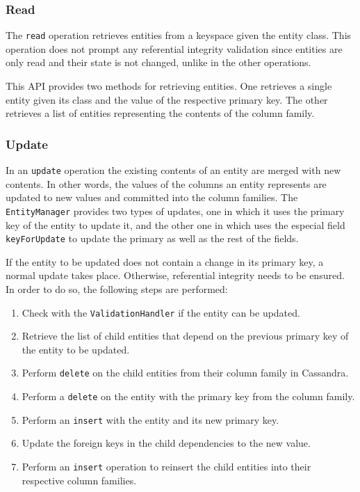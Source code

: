 		\subsubsection{Read}
		The  \texttt{read} operation retrieves  entities from a keyspace given the
		entity class. This operation does not prompt any referential integrity validation since
 		entities are only read and their state is not changed, unlike in the other
		operations.
		
		
		This \ac{API} provides two methods for retrieving entities. One retrieves a
		single entity given its class and the value of the respective primary key. The
		other retrieves a list of entities representing the contents of
		the column family.

		
		
		\subsubsection{Update}\label{ss:update}
		In an \texttt{update} operation the existing contents of an entity are merged
		with new contents.  In other words, the  values of the columns an entity
		represents are updated to new values and committed into the column families.  
		 The \texttt{EntityManager} provides two types of updates, one in which it
		 uses the primary key of the entity to update it, and the other one in
		 which uses the especial field \texttt{keyForUpdate} to update the primary as
		 well as the rest of the fields. 
		 
		 If the entity to be updated does not contain a change in its primary key, a
		 normal update takes place. Otherwise, referential integrity needs to be
		 ensured. In order to do so, the following steps are performed:
		\begin{enumerate}
		  \item Check with the \texttt{ValidationHandler} if the entity can be
		  updated.
		  \item Retrieve the list of child entities that depend on the previous
		  primary key of the entity to be updated.
		  \item Perform \texttt{delete} on the child entities from their column family
		  in Cassandra.
		  \item Perform a \texttt{delete} on the entity with the primary key from the
		  column family.
		  \item Perform an \texttt{insert} with the entity and its new primary key.
		  \item Update the foreign keys in the child dependencies to
		  the new value.
		  \item Perform an \texttt{insert} operation to reinsert the child entities
		  into their respective column families.
		\end{enumerate}
		
